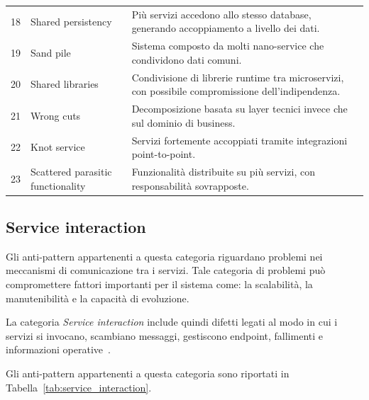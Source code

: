 \begin{table}[H]
\begin{tabularx}{\textwidth}{
>{\centering\arraybackslash}p{0.8cm}
>{\RaggedRight\arraybackslash}p{3.8cm}
>{\RaggedRight\arraybackslash}X
}
\addlinespace[0.3em]

18 & Shared persistency
& Più servizi accedono allo stesso database, generando accoppiamento a livello dei dati. \\

\addlinespace[0.3em]

19 & Sand pile
& Sistema composto da molti nano-service che condividono dati comuni. \\

\addlinespace[0.3em]

20 & Shared libraries
& Condivisione di librerie runtime tra microservizi, con possibile compromissione dell’indipendenza. \\

\addlinespace[0.3em]

21 & Wrong cuts
& Decomposizione basata su layer tecnici invece che sul dominio di business. \\

\addlinespace[0.3em]

22 & Knot service
& Servizi fortemente accoppiati tramite integrazioni point-to-point. \\

\addlinespace[0.3em]

23 & Scattered parasitic functionality
& Funzionalità distribuite su più servizi, con responsabilità sovrapposte. \\

\bottomrule
\end{tabularx}
\end{table}
\normalsize

\subsection{Service interaction}

Gli anti-pattern appartenenti a questa categoria riguardano problemi nei meccanismi di comunicazione tra i servizi. Tale categoria di problemi può compromettere fattori importanti per il sistema come: la scalabilità, la manutenibilità e la capacità di evoluzione.

La categoria \textit{Service interaction} include quindi difetti legati al modo in cui i servizi si invocano, scambiano messaggi, gestiscono endpoint, fallimenti e informazioni operative~\cite{CernyCatalogo}.

Gli anti-pattern appartenenti a questa categoria sono riportati in Tabella~\ref{tab:service_interaction}.

